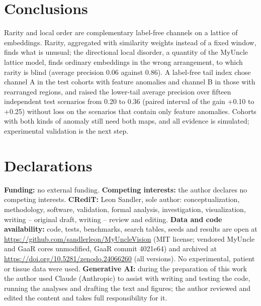 \documentclass[final,5p,times,twocolumn,authoryear]{elsarticle}
\begin{document}
\section{Conclusions}
Rarity and local order are complementary label-free channels on a lattice of embeddings. Rarity, aggregated with similarity weights instead of a fixed window, finds what is unusual; the directional local disorder, a quantity of the MyUncle lattice model, finds ordinary embeddings in the wrong arrangement, to which rarity is blind (average precision 0.06 against 0.86). A label-free tail index chose channel A in the test cohorts with feature anomalies and channel B in those with rearranged regions, and raised the lower-tail average precision over fifteen independent test scenarios from 0.20 to 0.36 (paired interval of the gain +0.10 to +0.25) without loss on the scenarios that contain only feature anomalies. Cohorts with both kinds of anomaly still need both maps, and all evidence is simulated; experimental validation is the next step.

\section*{Declarations}
\small
\textbf{Funding:} no external funding. \textbf{Competing interests:} the author declares no competing interests. \textbf{CRediT:} Leon Sandler, sole author: conceptualization, methodology, software, validation, formal analysis, investigation, visualization, writing -- original draft, writing -- review and editing. \textbf{Data and code availability:} code, tests, benchmarks, search tables, seeds and results are open at \url{https://github.com/sandlerleon/MyUncleVision} (MIT license; vendored MyUncle and GaaR cores unmodified, GaaR commit 4021e64) and archived at \url{https://doi.org/10.5281/zenodo.24066260} (all versions). No experimental, patient or tissue data were used. \textbf{Generative AI:} during the preparation of this work the author used Claude (Anthropic) to assist with writing and testing the code, running the analyses and drafting the text and figures; the author reviewed and edited the content and takes full responsibility for it.
\normalsize
\end{document}
